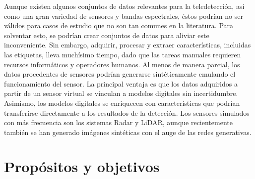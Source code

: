 Aunque existen algunos conjuntos de datos relevantes para la teledetección, así como una gran variedad de sensores y bandas espectrales, éstos podrían no ser válidos para casos de estudio que no son tan comunes en la literatura. Para solventar esto, se podrían crear conjuntos de datos para aliviar este inconveniente. Sin embargo, adquirir, procesar y extraer características, incluidas las etiquetas, lleva muchísimo tiempo, dado que las tareas manuales requieren recursos informáticos y operadores humanos. Al menos de manera parcial, los datos procedentes de sensores podrían generarse sintéticamente emulando el funcionamiento del sensor. La principal ventaja es que los datos adquiridos a partir de un sensor virtual se vinculan a modelos digitales sin incertidumbre. Asimismo, los modelos digitales se enriquecen con características que podrían transferirse directamente a los resultados de la detección. Los sensores simulados con más frecuencia son los sistemas Radar y LiDAR, aunque recientemente también se han generado imágenes sintéticas con el auge de las redes generativas.

\section{Propósitos y objetivos}

